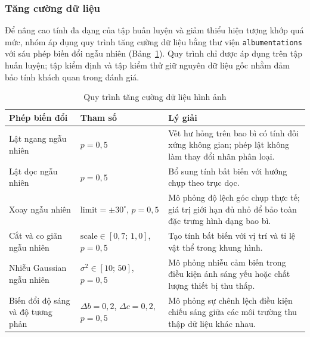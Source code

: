 \subsubsection{Tăng cường dữ liệu}

Để nâng cao tính đa dạng của tập huấn luyện và giảm thiểu hiện tượng khớp quá
mức, nhóm áp dụng quy trình tăng cường dữ liệu bằng thư viện
\texttt{albumentations} với sáu phép biến đổi ngẫu nhiên
(Bảng~\ref{tab:augmentation}). Quy trình chỉ được áp dụng trên tập huấn luyện;
tập kiểm định và tập kiểm thử giữ nguyên dữ liệu gốc nhằm đảm bảo tính khách
quan trong đánh giá.

\begin{table}[H]
    \centering
    \caption{Quy trình tăng cường dữ liệu hình ảnh}
    \label{tab:augmentation}
    \begin{tabular}{p{4cm}p{3.5cm}p{7cm}}
        \hline
        \textbf{Phép biến đổi} & \textbf{Tham số} & \textbf{Lý giải} \\
        \hline
        Lật ngang ngẫu nhiên
            & $p = 0{,}5$
            & Vết hư hỏng trên bao bì có tính đối xứng không gian; phép
              lật không làm thay đổi nhãn phân loại. \\[4pt]
        Lật dọc ngẫu nhiên
            & $p = 0{,}5$
            & Bổ sung tính bất biến với hướng chụp theo trục dọc. \\[4pt]
        Xoay ngẫu nhiên
            & $\text{limit} = \pm 30^{\circ}$, $p = 0{,}5$
            & Mô phỏng độ lệch góc chụp thực tế; giá trị giới hạn đủ nhỏ
              để bảo toàn đặc trưng hình dạng bao bì. \\[4pt]
        Cắt và co giãn ngẫu nhiên
            & $\text{scale} \in [0{,}7;\,1{,}0]$, $p = 0{,}5$
            & Tạo tính bất biến với vị trí và tỉ lệ vật thể trong
              khung hình. \\[4pt]
        Nhiễu Gaussian ngẫu nhiên
            & $\sigma^2 \in [10;\,50]$, $p = 0{,}5$
            & Mô phỏng nhiễu cảm biến trong điều kiện ánh sáng yếu
              hoặc chất lượng thiết bị thu thấp. \\[4pt]
        Biến đổi độ sáng và độ tương phản
            & $\Delta b = 0{,}2$, $\Delta c = 0{,}2$, $p = 0{,}5$
            & Mô phỏng sự chênh lệch điều kiện chiếu sáng giữa các môi
              trường thu thập dữ liệu khác nhau. \\
        \hline
    \end{tabular}
\end{table}


